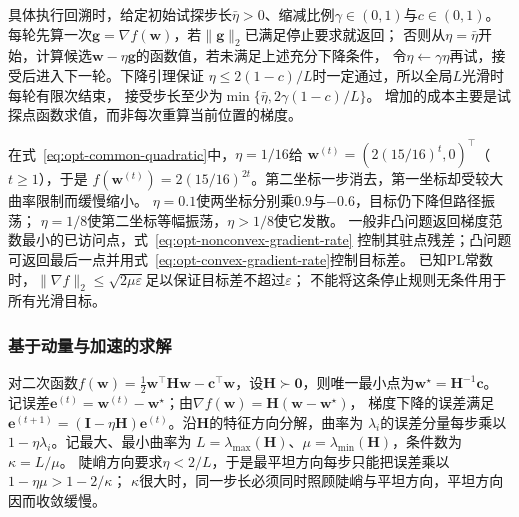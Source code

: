 具体执行回溯时，给定初始试探步长$\bar\eta>0$、缩减比例$\gamma\in(0,1)$与$c\in(0,1)$。
每轮先算一次$\bm g=\nabla f(\bm w)$，若$\|\bm g\|_2$已满足停止要求就返回；
否则从$\eta=\bar\eta$开始，计算候选$\bm w-\eta\bm g$的函数值，若未满足上述充分下降条件，
令$\eta\leftarrow\gamma\eta$再试，接受后进入下一轮。下降引理保证
$\eta\leq2(1-c)/L$时一定通过，所以全局$L$光滑时每轮有限次结束，
接受步长至少为$\min\{\bar\eta,2\gamma(1-c)/L\}$。
增加的成本主要是试探点函数求值，而非每次重算当前位置的梯度。

在式~\eqref{eq:opt-common-quadratic}中，$\eta=1/16$给
$\bm w^{(t)}=(2(15/16)^t,0)^\top$（$t\geq1$），于是
$f(\bm w^{(t)})=2(15/16)^{2t}$。第二坐标一步消去，第一坐标却受较大曲率限制而缓慢缩小。
$\eta=0.1$使两坐标分别乘$0.9$与$-0.6$，目标仍下降但路径振荡；
$\eta=1/8$使第二坐标等幅振荡，$\eta>1/8$使它发散。
一般非凸问题返回梯度范数最小的已访问点，式~\eqref{eq:opt-nonconvex-gradient-rate}
控制其驻点残差；凸问题可返回最后一点并用式~\eqref{eq:opt-convex-gradient-rate}控制目标差。
已知PL常数时，$\|\nabla f\|_2\leq\sqrt{2\mu\varepsilon}$足以保证目标差不超过$\varepsilon$；
不能将这条停止规则无条件用于所有光滑目标。

\subsubsection{基于动量与加速的求解}
\label{sec:opt-curvature-acceleration}

对二次函数$f(\bm{w})=\frac12\bm{w}^{\top}\bm{H}\bm{w}
-\bm{c}^{\top}\bm{w}$，设$\bm H\succ\bm 0$，则唯一最小点为$\bm w^\star=\bm H^{-1}\bm c$。
记误差$\bm e^{(t)}=\bm w^{(t)}-\bm w^\star$；由$\nabla f(\bm w)=\bm H(\bm w-\bm w^\star)$，
梯度下降的误差满足
$\bm{e}^{(t+1)}=(\bm{I}-\eta\bm{H})\bm{e}^{(t)}$。沿$\bm H$的特征方向分解，曲率为
$\lambda_i$的误差分量每步乘以$1-\eta\lambda_i$。记最大、最小曲率为
$L=\lambda_{\max}(\bm H)$、$\mu=\lambda_{\min}(\bm H)$，条件数为$\kappa=L/\mu$。
陡峭方向要求$\eta<2/L$，于是最平坦方向每步只能把误差乘以$1-\eta\mu>1-2/\kappa$；
$\kappa$很大时，同一步长必须同时照顾陡峭与平坦方向，平坦方向因而收敛缓慢。

